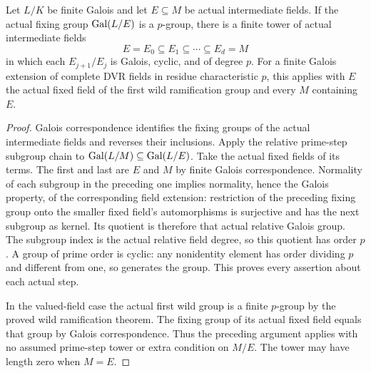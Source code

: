 \begin{lemma}
\label{fw:relative-prime-field-tower}
\leanok
Let $L/K$ be finite Galois and let $E\subseteq M$ be actual
intermediate fields. If the actual fixing group $\operatorname{Gal}(L/E)$
is a $p$-group, there is a finite tower of actual intermediate fields
\[
 E=E_0\subseteq E_1\subseteq\cdots\subseteq E_d=M
\]
in which each $E_{j+1}/E_j$ is Galois, cyclic, and of degree $p$.
For a finite Galois extension of complete DVR fields in residue
characteristic $p$, this applies with $E$ the actual fixed field
of the first wild ramification group and every $M$ containing $E$.
\end{lemma}
\begin{proof}
Galois correspondence identifies the fixing groups of the actual
intermediate fields and reverses their inclusions. Apply the
relative prime-step subgroup chain to
$\operatorname{Gal}(L/M)\subseteq\operatorname{Gal}(L/E)$. Take the actual fixed fields of
its terms. The first and last are $E$ and $M$ by finite Galois
correspondence. Normality of each subgroup in the preceding one
implies normality, hence the Galois property, of the corresponding
field extension: restriction of the preceding fixing group onto
the smaller fixed field's automorphisms is surjective and has the
next subgroup as kernel. Its quotient is therefore that actual
relative Galois group. The subgroup index is the actual relative
field degree, so this quotient has order $p$. A group of prime
order is cyclic: any nonidentity element has order dividing $p$
and different from one, so generates the group. This proves every
assertion about each actual step.

In the valued-field case the actual first wild group is a finite
$p$-group by the proved wild ramification theorem. The fixing group
of its actual fixed field equals that group by Galois correspondence.
Thus the preceding argument applies with no assumed prime-step
tower or extra condition on $M/E$. The tower may have length zero
when $M=E$.
\end{proof}

